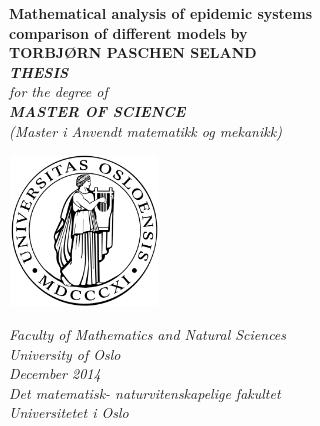 %
\thispagestyle{empty}
\begin{center}        %
  \vspace{5mm}          %
  \LARGE
  \textbf{Mathematical analysis of epidemic systems \\ comparison of different models}
  \Large
  \vspace{5mm}
  \textbf{by} \\
  \vspace{5mm}
  \large
  \textbf{TORBJØRN PASCHEN SELAND} \\
  \vspace{30mm}
  \Large
  {\bf{\textsl{THESIS}}} \\
  \textsl{for the degree of} \\
  \vspace{2mm}
  {\bf{\textsl{MASTER OF SCIENCE}}} \\
  \vspace{5mm}
  {\large \textsl {(Master i Anvendt matematikk og mekanikk)}}\\
  \vspace{10mm}
  \centerline{\includegraphics[width=4cm,height=4cm]{uiologo.png}}
  \vspace{5mm}
  \textsl{Faculty of Mathematics and Natural Sciences} \\
  \textsl{University of Oslo} \\
  \vspace{10mm}
  \large
  \textsl{December 2014} \\
  \vspace{5mm}
  \normalsize
  \textsl{Det matematisk- naturvitenskapelige fakultet} \\
  \textsl{Universitetet i Oslo} \\
\end{center}
%

